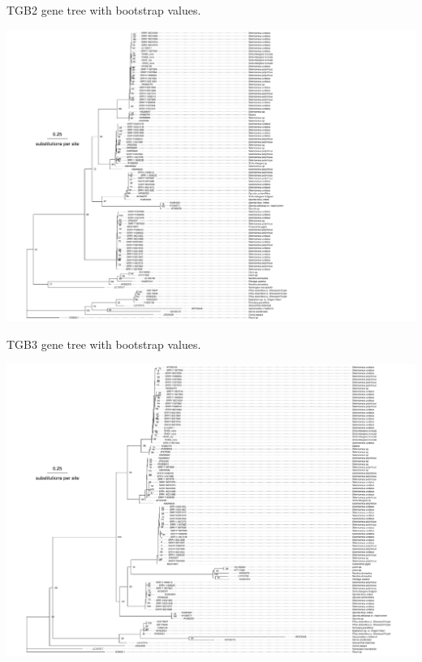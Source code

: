 \documentclass[11pt]{article}
\begin{document}
\begin{suppfigure}
\centering
\caption{
TGB2 gene tree with bootstrap values.
}
\includegraphics[width=1.5\textwidth]{supplementaryinfo/tgb2_tr.pdf}
\label{fig:genetree3}
\end{suppfigure}
\clearpage

\begin{suppfigure}
\centering
\caption{
TGB3 gene tree with bootstrap values.
}
\includegraphics[width=1.2\textwidth]{supplementaryinfo/tgb3_tr.pdf}
\label{fig:genetree4}
\end{suppfigure}
\clearpage
\end{document}
